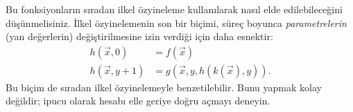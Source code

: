 Bu fonksiyonların sıradan ilkel özyineleme kullanılarak nasıl elde
edilebileceğini düşünmelisiniz. İlkel özyinelemenin son bir biçimi, süreç
boyunca \emph{parametrelerin} (yan değerlerin) değiştirilmesine izin verdiği
için daha esnektir:
\begin{align*}
  h(\vec x,0) & = f(\vec x)\\
  h(\vec x,y+1) & = g(\vec x,y,h(k(\vec x),y)).
\end{align*}
Bu biçim de sıradan ilkel özyinelemeyle benzetilebilir. Bunu yapmak kolay
değildir; ipucu olarak hesabı elle geriye doğru açmayı deneyin.

